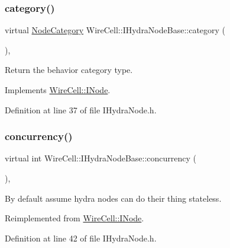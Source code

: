 \subsubsection{\texorpdfstring{category()}{category()}}
{\footnotesize\ttfamily virtual \hyperlink{class_wire_cell_1_1_i_node_a5546e64cbb70bd3ac787295cac9ac803}{Node\+Category} Wire\+Cell\+::\+I\+Hydra\+Node\+Base\+::category (\begin{DoxyParamCaption}{ }\end{DoxyParamCaption})\hspace{0.3cm}{\ttfamily [inline]}, {\ttfamily [virtual]}}



Return the behavior category type. 



Implements \hyperlink{class_wire_cell_1_1_i_node_a58c07f15b165e5fb33bbc7b2e047b39b}{Wire\+Cell\+::\+I\+Node}.



Definition at line 37 of file I\+Hydra\+Node.\+h.

\mbox{\label{class_wire_cell_1_1_i_hydra_node_base_a6bcaeb0a80fa720c3180d9b9d8b9fd22}} 
\subsubsection{\texorpdfstring{concurrency()}{concurrency()}}
{\footnotesize\ttfamily virtual int Wire\+Cell\+::\+I\+Hydra\+Node\+Base\+::concurrency (\begin{DoxyParamCaption}{ }\end{DoxyParamCaption})\hspace{0.3cm}{\ttfamily [inline]}, {\ttfamily [virtual]}}



By default assume hydra nodes can do their thing stateless. 



Reimplemented from \hyperlink{class_wire_cell_1_1_i_node_a87d2b7293da4f6955e389ac6a2011306}{Wire\+Cell\+::\+I\+Node}.



Definition at line 42 of file I\+Hydra\+Node.\+h.

\mbox{\label{class_wire_cell_1_1_i_hydra_node_base_a7840530686daf7ba07beaf74c68b3d02}} 
